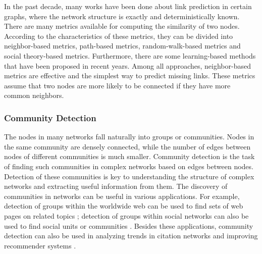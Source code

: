 \documentclass[\main/thesis.tex]{subfiles}
\begin{document}
In the past decade, many works have been done about link prediction in certain graphs, where the network structure is exactly and deterministically known. There are many metrics available for computing the similarity of two nodes. According to the characteristics of these metrics, they can be divided into neighbor-based metrics, path-based metrics, random-walk-based metrics and social theory-based metrics. Furthermore, there are some learning-based methods that have been proposed in recent years. Among all approaches, neighbor-based metrics are effective and the simplest way to predict missing links. These metrics assume that two nodes are more likely to be connected if they have more common neighbors. %

\subsubsection{Community Detection}
The nodes in many networks fall naturally into groups or communities. Nodes in the same community are densely connected, while the number of edges between nodes of different communities is much smaller. Community detection is the task of finding such communities in complex networks based on edges between nodes. Detection of these communities is key to understanding the structure of complex networks and extracting useful information from them. The discovery of communities in networks can be useful in various applications. For example, detection of groups within the worldwide web can be used to find sets of web pages on related topics \cite{flake2002self}; detection of groups within social networks can also be used to find social units or communities \cite{girvan2002community}. Besides these applications, community detection can also be used in analyzing trends in citation networks \cite{bedi2016community} and improving recommender systems \cite{cao2015improved}. 
\end{document}
